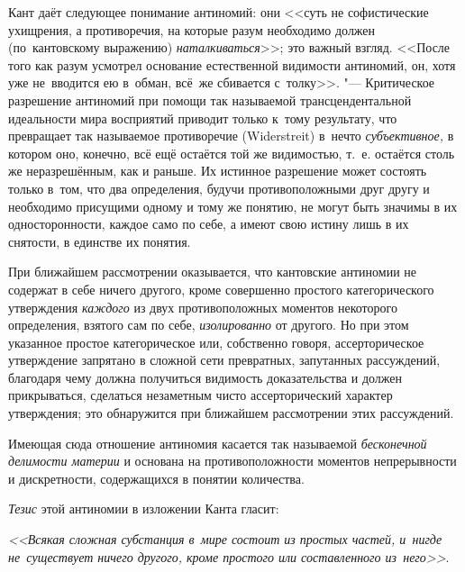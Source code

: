 Кант даёт следующее понимание антиномий: они <<суть не софистические
ухищрения, а противоречия, на которые разум необходимо должен (по~кантовскому
выражению) {\em наталкиваться}>>; это важный взгляд. <<После того как
разум усмотрел основание естественной видимости антиномий, он, хотя уже
не~вводится ею в~обман, всё~же сбивается с~толку>>. "--- Критическое разрешение антиномий при помощи так
называемой трансцендентальной идеальности мира восприятий приводит только
к~тому результату, что превращает так называемое противоречие (Wider\-streit)
в~нечто {\em субъективное,} в котором оно, конечно, всё ещё остаётся той же
видимостью, т.~е. остаётся столь же неразрешённым, как и раньше. Их истинное
разрешение может состоять только в~том, что два определения, будучи
противоположными друг другу и необходимо присущими одному и тому же понятию, не
могут быть значимы в их односторонности, каждое само по себе, а имеют свою
истину лишь в их снятости, в единстве их понятия.

При ближайшем рассмотрении оказывается, что кантовские антиномии не содержат
в себе ничего другого, кроме совершенно простого категорического
утверждения {\em каждого} из двух противоположных
моментов некоторого определения, взятого сам по себе,
{\em изолированно} от другого. Но при этом указанное
простое категорическое или, собственно говоря, ассерторическое утверждение
запрятано в сложной сети превратных, запутанных рассуждений, благодаря чему
должна получиться видимость доказательства и должен прикрываться, сделаться
незаметным чисто ассерторический характер утверждения; это обнаружится при
ближайшем рассмотрении этих рассуждений.

Имеющая сюда отношение антиномия касается так называемой
{\em бесконечной делимости материи} и основана на
противоположности моментов непрерывности и дискретности, содержащихся в
понятии количества.

{\em Тезис} этой антиномии в изложении Канта гласит:

{\em <<Всякая сложная субстанция в~мире состоит из простых частей, и~нигде
не~существует ничего другого, кроме простого или составленного
из~него>>}.

